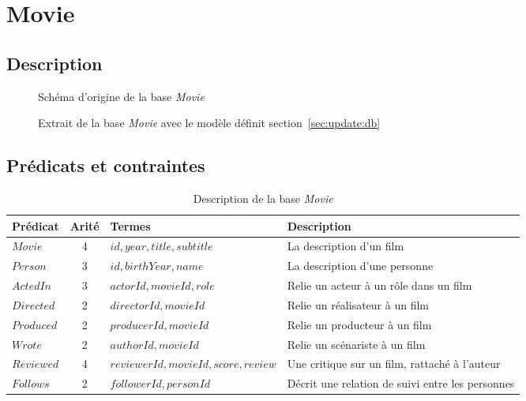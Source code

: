\minitoc

\section{Movie}

\subsection{Description}

\begin{figure}[H]
    \caption{Schéma d'origine de la base \textit{Movie}}
\end{figure}

\begin{figure}[H]
    \caption{Extrait de la base \textit{Movie} avec le modèle définit section~\ref{sec:update:db}}
\end{figure}

\subsection{Prédicats et contraintes}

\begin{table}[H]
    \centering
    \begin{adjustbox}{max width=\linewidth}
        \begin{tabular}{l|c|l|l}
            Prédicat & Arité & Termes & Description \\
            \hline
            \hline
            $Movie$ & 4 & $id, year, title, subtitle$ & La description d'un film \\
            $Person$ & 3 & $id, birthYear, name$ & La description d'une personne \\
            $ActedIn$ & 3 & $actorId, movieId, role$ & Relie un acteur à un rôle dans un film \\
            $Directed$ & 2 & $directorId, movieId$ & Relie un réalisateur à un film \\
            $Produced$ & 2 & $producerId, movieId$ & Relie un producteur à un film \\
            $Wrote$ & 2 & $authorId, movieId$ & Relie un scénariste à un film \\
            $Reviewed$ & 4 & $reviewerId, movieId, score, review$ & Une critique sur un film, rattaché à l'auteur \\
            $Follows$ & 2 & $followerId, personId$ & Décrit une relation de suivi entre les personnes \\
        \end{tabular}
    \end{adjustbox}
    \caption{Description de la base \textit{Movie}}
\end{table}

